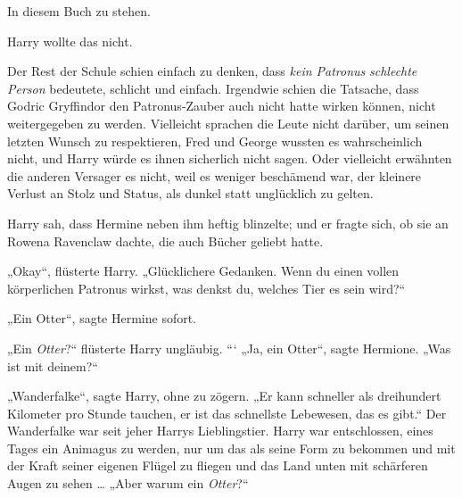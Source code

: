 In diesem Buch zu stehen.

Harry wollte das nicht.

Der Rest der Schule schien einfach zu denken, dass \emph{kein Patronus} \emph{schlechte Person} bedeutete, schlicht und einfach. Irgendwie schien die Tatsache, dass Godric Gryffindor den Patronus-Zauber auch nicht hatte wirken können, nicht weitergegeben zu werden. Vielleicht sprachen die Leute nicht darüber, um seinen letzten Wunsch zu respektieren, Fred und George wussten es wahrscheinlich nicht, und Harry würde es ihnen sicherlich nicht sagen. Oder vielleicht erwähnten die anderen Versager es nicht, weil es weniger beschämend war, der kleinere Verlust an Stolz und Status, als dunkel statt unglücklich zu gelten.

Harry sah, dass Hermine neben ihm heftig blinzelte; und er fragte sich, ob sie an Rowena Ravenclaw dachte, die auch Bücher geliebt hatte.

„Okay“, flüsterte Harry.
„Glücklichere Gedanken. Wenn du einen vollen körperlichen Patronus wirkst, was denkst du, welches Tier es sein wird?“

„Ein Otter“, sagte Hermine sofort.

„Ein \emph{Otter}?“ flüsterte Harry ungläubig.
```
„Ja, ein Otter“, sagte Hermione.
„Was ist mit deinem?“

„Wanderfalke“, sagte Harry, ohne zu zögern.
„Er kann schneller als dreihundert Kilometer pro Stunde tauchen, er ist das schnellste Lebewesen, das es gibt.“ Der Wanderfalke war seit jeher Harrys Lieblingstier. Harry war entschlossen, eines Tages ein Animagus zu werden, nur um das als seine Form zu bekommen und mit der Kraft seiner eigenen Flügel zu fliegen und das Land unten mit schärferen Augen zu sehen …
„Aber warum ein \emph{Otter}?“

